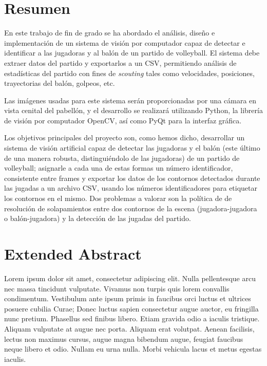 \section*{Resumen}
En este trabajo de fin de grado se ha abordado el análisis, diseño e implementación de un sistema de visión por computador capaz de detectar e identificar a las jugadoras y al balón de un partido de volleyball. El sistema debe extraer datos del partido y exportarlos a un CSV, permitiendo análisis de estadísticas del partido con fines de \textit{scouting} tales como velocidades, posiciones, trayectorias del balón, golpeos, etc. 

Las imágenes usadas para este sistema serán proporcionadas por una cámara en vista cenital del pabellón, y el desarrollo se realizará utilizando Python, la librería de visión por computador OpenCV, así como PyQt para la interfaz gráfica.

Los objetivos principales del proyecto son, como hemos dicho, desarrollar un sistema de visión artificial capaz de detectar las jugadoras y el balón (este último de una manera robusta, distinguiéndolo de las jugadoras) de un partido de volleyball; asignarle a cada una de estas formas un número identificador, consistente entre frames y exportar los datos de los contornos detectados durante las jugadas a un archivo CSV, usando los números identificadores para etiquetar los contornos en el mismo. Dos problemas a valorar son la política de de resolución de solapamientos entre dos contornos de la escena (jugadora-jugadora o balón-jugadora) y la detección de las jugadas del partido.


\newpage
\section*{Extended Abstract}


Lorem ipsum dolor sit amet, consectetur adipiscing elit. Nulla pellentesque arcu nec massa tincidunt vulputate. Vivamus non turpis quis lorem convallis condimentum. Vestibulum ante ipsum primis in faucibus orci luctus et ultrices posuere cubilia Curae; Donec luctus sapien consectetur augue auctor, eu fringilla nunc pretium. Phasellus sed finibus libero. Etiam gravida odio a iaculis tristique. Aliquam vulputate at augue nec porta. Aliquam erat volutpat. Aenean facilisis, lectus non maximus cursus, augue magna bibendum augue, feugiat faucibus neque libero et odio. Nullam eu urna nulla. Morbi vehicula lacus et metus egestas iaculis.

